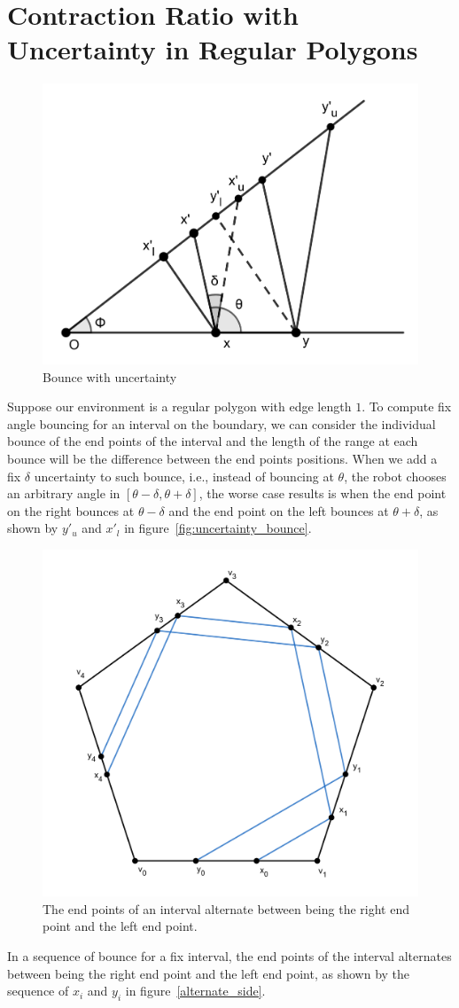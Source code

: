\documentclass[11pt]{article}%
\begin{document}
\section{Contraction Ratio with Uncertainty in Regular Polygons}

\begin{figure}[!h]
  \centering
  \includegraphics[width=0.5\linewidth]{uncertainty_bounce.png}
  \caption{Bounce with uncertainty}
  \label{fig:uncertain_bounce}
\end{figure}
Suppose our environment is a regular polygon with edge length $1$. To compute fix angle bouncing for an interval on the boundary, we can consider the individual bounce of the end points of the interval and the length of the range at each bounce will be the difference between the end points positions. When we add a fix $\delta$ uncertainty to such bounce, i.e., instead of bouncing at $\theta$, the robot chooses an arbitrary angle in $[\theta - \delta, \theta + \delta]$, the worse case results is when the end point on the right bounces at $\theta - \delta$ and the end point on the left bounces at $\theta + \delta$, as shown by $y'_u$ and $x'_l$ in figure~\ref{fig:uncertainty_bounce}. 
\begin{figure}[!h]
  \centering
  \includegraphics[width=0.5\linewidth]{alternate_side.png}
  \caption{The end points of an interval alternate between being the right end point and the left end point.}
  \label{fig:alternate_side}
\end{figure}
In a sequence of bounce for a fix interval, the end points of the interval alternates between being the right end point and the left end point, as shown by the sequence of $x_i$ and $y_i$ in figure~\ref{alternate_side}.
\end{document}
